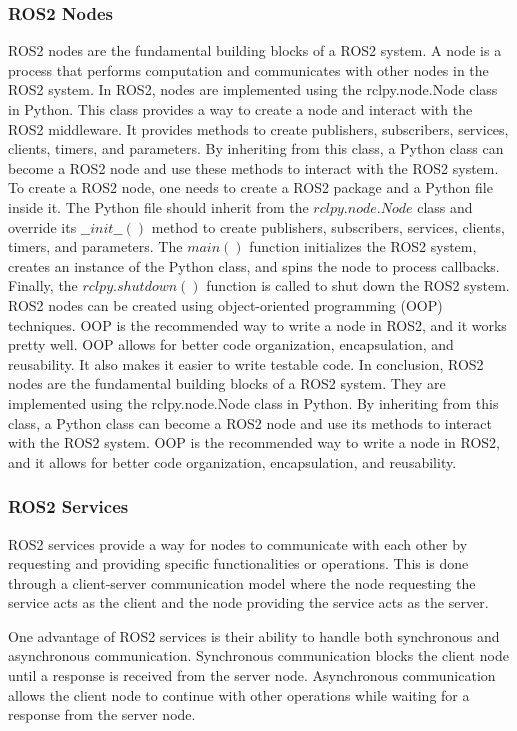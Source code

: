 \documentclass[12pt,oneside]{article}
\begin{document}
\subsubsection{ROS2 Nodes}\label{ros2-nodes}
ROS2 nodes are the fundamental building blocks of a ROS2 system. A node is a process that performs computation and communicates with other nodes in the ROS2 system. In ROS2, nodes are implemented using the rclpy.node.Node class in Python. This class provides a way to create a node and interact with the ROS2 middleware. It provides methods to create publishers, subscribers, services, clients, timers, and parameters. By inheriting from this class, a Python class can become a ROS2 node and use these methods to interact with the ROS2 system.
To create a ROS2 node, one needs to create a ROS2 package and a Python file inside it. The Python file should inherit from the $rclpy.node.Node$ class and override its $\_\_init\_\_()$ method to create publishers, subscribers, services, clients, timers, and parameters. The $main()$ function initializes the ROS2 system, creates an instance of the Python class, and spins the node to process callbacks. Finally, the $rclpy.shutdown()$ function is called to shut down the ROS2 system.\cite{ros2docs}
ROS2 nodes can be created using object-oriented programming (OOP) techniques. OOP is the recommended way to write a node in ROS2, and it works pretty well. OOP allows for better code organization, encapsulation, and reusability. It also makes it easier to write testable code.
In conclusion, ROS2 nodes are the fundamental building blocks of a ROS2 system. They are implemented using the rclpy.node.Node class in Python. By inheriting from this class, a Python class can become a ROS2 node and use its methods to interact with the ROS2 system. OOP is the recommended way to write a node in ROS2, and it allows for better code organization, encapsulation, and reusability.

\subsubsection{ROS2 Services}\label{ros2-services}
ROS2 services provide a way for nodes to communicate with each other by requesting and providing specific functionalities or operations. This is done through a client-server communication model where the node requesting the service acts as the client and the node providing the service acts as the server.

One advantage of ROS2 services is their ability to handle both synchronous and asynchronous communication. Synchronous communication blocks the client node until a response is received from the server node. Asynchronous communication allows the client node to continue with other operations while waiting for a response from the server node.
\end{document}
